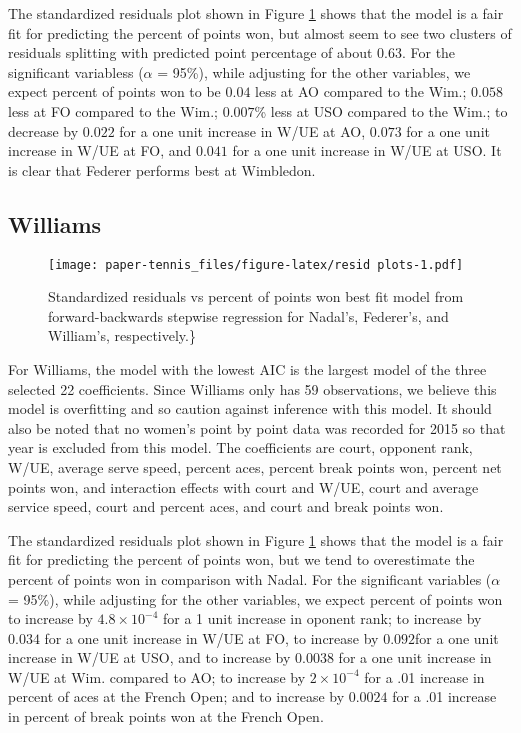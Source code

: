 \documentclass[]{article}
\begin{document}
The standardized residuals plot shown in Figure \ref{fig:individ-resids}
shows that the model is a fair fit for predicting the percent of points
won, but almost seem to see two clusters of residuals splitting with
predicted point percentage of about 0.63. For the significant variabless
(\(\alpha\) = 95\%), while adjusting for the other variables, we expect
percent of points won to be \(0.04\) less at AO compared to the Wim.;
\(0.058\) less at FO compared to the Wim.; \(0.007\)\% less at USO
compared to the Wim.; to decrease by \(0.022\) for a one unit increase
in W/UE at AO, \(0.073\) for a one unit increase in W/UE at FO, and
\(0.041\) for a one unit increase in W/UE at USO. It is clear that
Federer performs best at Wimbledon.

\hypertarget{williams}{%
\subsection{Williams}\label{williams}}

\begin{figure}
\centering
\texttt{[image: paper-tennis\_files/figure-latex/resid plots-1.pdf]}
\caption{\label{fig:individ-resids}Standardized residuals vs percent of
points won best fit model from forward-backwards stepwise regression for
Nadal's, Federer's, and William's, respectively.\}}
\end{figure}

For Williams, the model with the lowest AIC is the largest model of the
three selected 22 coefficients. Since Williams only has 59 observations,
we believe this model is overfitting and so caution against inference
with this model. It should also be noted that no women's point by point
data was recorded for 2015 so that year is excluded from this model. The
coefficients are court, opponent rank, W/UE, average serve speed,
percent aces, percent break points won, percent net points won, and
interaction effects with court and W/UE, court and average service
speed, court and percent aces, and court and break points won.

The standardized residuals plot shown in Figure \ref{fig:individ-resids}
shows that the model is a fair fit for predicting the percent of points
won, but we tend to overestimate the percent of points won in comparison
with Nadal. For the significant variables (\(\alpha\) = 95\%), while
adjusting for the other variables, we expect percent of points won to
increase by \(4.8\times 10^{-4}\) for a 1 unit increase in oponent rank;
to increase by \(0.034\) for a one unit increase in W/UE at FO, to
increase by \(0.092\)for a one unit increase in W/UE at USO, and to
increase by \(0.0038\) for a one unit increase in W/UE at Wim. compared
to AO; to increase by \(2\times 10^{-4}\) for a .01 increase in percent
of aces at the French Open; and to increase by \(0.0024\) for a .01
increase in percent of break points won at the French Open.
\end{document}
